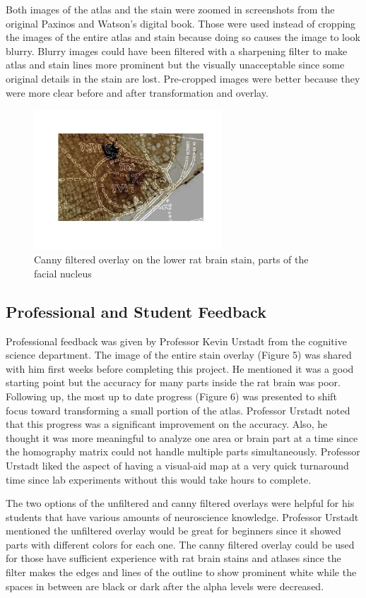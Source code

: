 \documentclass[10pt,twocolumn]{article}
\begin{document}
Both images of the atlas and the stain were zoomed in screenshots from the original Paxinos and Watson's digital book. Those were used instead of cropping the images of the entire atlas and stain because doing so causes the image to look blurry. Blurry images could have been filtered with a sharpening filter to make atlas and stain lines more prominent but the visually unacceptable since some original details in the stain are lost. Pre-cropped images were better because they were more clear before and after transformation and overlay. 
\begin{figure}[htp]
    \centering
    \includegraphics[width=7cm]{result.jpg}
    \caption{Canny filtered overlay on the lower rat brain stain, parts of the facial nucleus}
\end{figure}

\subsection{Professional and Student Feedback}
Professional feedback was given by Professor Kevin Urstadt from the cognitive science department. The image of the entire stain overlay (Figure 5) was shared with him first weeks before completing this project. He mentioned it was a good starting point but the accuracy for many parts inside the rat brain was poor. Following up, the most up to date progress (Figure 6) was presented to shift focus toward transforming a small portion of the atlas. Professor Urstadt noted that this progress was a significant improvement on the accuracy. Also, he thought it was more meaningful to analyze one area or brain part at a time since the homography matrix could not handle multiple parts simultaneously. Professor Urstadt liked the aspect of having a visual-aid map at a very quick turnaround time since lab experiments without this would take hours to complete. 

The two options of the unfiltered and canny filtered overlays were helpful for his students that have various amounts of neuroscience knowledge. Professor Urstadt mentioned the unfiltered overlay would be great for beginners since it showed parts with different colors for each one. The canny filtered overlay could be used for those have sufficient experience with rat brain stains and atlases since the filter makes the edges and lines of the outline to show prominent white while the spaces in between are black or dark after the alpha levels were decreased.
\end{document}

